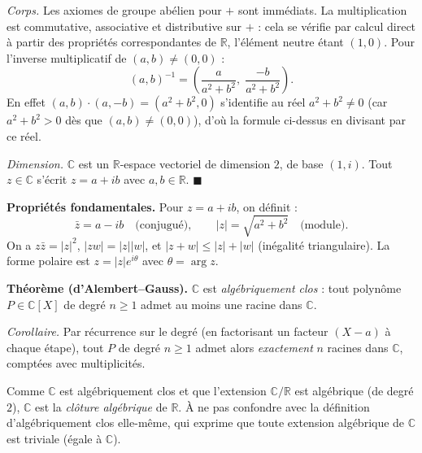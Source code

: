 
\begin{mdframed}[style=proofbar]
  \textit{Corps.} Les axiomes de groupe abélien pour $+$ sont immédiats. La
  multiplication est commutative, associative et distributive sur $+$ : cela se
  vérifie par calcul direct à partir des propriétés correspondantes de $\mathbb{R}$,
  l'élément neutre étant $(1,0)$. Pour l'inverse multiplicatif de
  $(a,b) \neq (0,0)$ :
  \[
    {(a,b)}^{-1} = \left(\frac{a}{a^2+b^2},\; \frac{-b}{a^2+b^2}\right).
  \]
  En effet $(a,b)\cdot(a,-b) = (a^2+b^2, 0)$ s'identifie au réel $a^2+b^2 \neq 0$
  (car $a^2+b^2 > 0$ dès que $(a,b)\neq(0,0)$), d'où la formule ci-dessus en
  divisant par ce réel.

  \textit{Dimension.} $\mathbb{C}$ est un $\mathbb{R}$-espace vectoriel de dimension $2$,
  de base $(1, i)$. Tout $z \in \mathbb{C}$ s'écrit $z = a + ib$ avec $a,b\in\mathbb{R}$.
  $\blacksquare$
\end{mdframed}

\begin{tcolorbox}[thmbox]
  \textbf{Propriétés fondamentales.}\enspace%
  Pour $z = a+ib$, on définit :
  \[
    \bar{z} = a - ib \quad \text{(conjugué)}, \qquad
    |z| = \sqrt{a^2+b^2} \quad \text{(module)}.
  \]
  On a $z \bar{z} = |z|^2$, $|zw| = |z||w|$, et $|z+w| \leq |z|+|w|$
  (inégalité triangulaire).
  La forme polaire est $z = |z|e^{i\theta}$ avec $\theta = \arg z$.
\end{tcolorbox}

\decsep{}


\begin{tcolorbox}[thmbox]
  \textbf{Théorème (d'Alembert–Gauss).}\enspace%
  $\mathbb{C}$ est \emph{algébriquement clos} : tout polynôme
  $P \in \mathbb{C}[X]$ de degré $n \geq 1$ admet au moins une racine dans
  $\mathbb{C}$.

  \medskip
  \emph{Corollaire.} Par récurrence sur le degré (en factorisant un facteur
  $(X-a)$ à chaque étape), tout $P$ de degré $n \geq 1$ admet alors
  \emph{exactement} $n$ racines dans $\mathbb{C}$, comptées avec multiplicités.

  \medskip
  Comme $\mathbb{C}$ est algébriquement clos et que l'extension
  $\mathbb{C}/\mathbb{R}$ est algébrique (de degré $2$), $\mathbb{C}$ est la
  \emph{clôture algébrique} de $\mathbb{R}$. À ne pas confondre avec la définition
  d'algébriquement clos elle-même, qui exprime que toute extension algébrique de
  $\mathbb{C}$ est triviale (égale à $\mathbb{C}$).
\end{tcolorbox}

